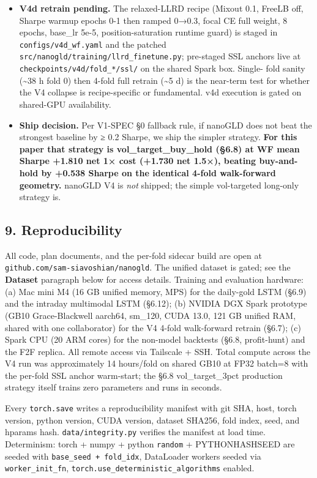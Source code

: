 \documentclass[
]{article}
\begin{document}
\begin{itemize}
  algorithmic limitation; it is a hardware one.
\item
  \textbf{V4d retrain pending.} The relaxed-LLRD recipe (Mixout 0.1,
  FreeLB off, Sharpe warmup epochs 0-1 then ramped 0→0.3, focal CE full
  weight, 8 epochs, base\_lr 5e-5, position-saturation runtime guard) is
  staged in \texttt{configs/v4d\_wf.yaml} and the patched
  \texttt{src/nanogld/training/llrd\_finetune.py}; pre-staged SSL
  anchors live at \texttt{checkpoints/v4d/fold\_*/ssl/} on the shared
  Spark box. Single- fold sanity (\textasciitilde38 h fold 0) then
  4-fold full retrain (\textasciitilde5 d) is the near-term test for
  whether the V4 collapse is recipe-specific or fundamental. v4d
  execution is gated on shared-GPU availability.
\item
  \textbf{Ship decision.} Per V1-SPEC §0 fallback rule, if nanoGLD does
  not beat the strongest baseline by ≥ 0.2 Sharpe, we ship the simpler
  strategy. \textbf{For this paper that strategy is
  vol\_target\_buy\_hold (§6.8) at WF mean Sharpe +1.810 net 1× cost
  (+1.730 net 1.5×), beating buy-and-hold by +0.538 Sharpe on the
  identical 4-fold walk-forward geometry.} nanoGLD V4 is \emph{not}
  shipped; the simple vol-targeted long-only strategy is.
\end{itemize}

\subsection{9. Reproducibility}\label{reproducibility}

All code, plan documents, and the per-fold sidecar build are open at
\texttt{github.com/sam-siavoshian/nanogld}. The unified dataset is
gated; see the \textbf{Dataset} paragraph below for access details.
Training and evaluation hardware: (a) Mac mini M4 (16 GB unified memory,
MPS) for the daily-gold LSTM (§6.9) and the intraday multimodal LSTM
(§6.12); (b) NVIDIA DGX Spark prototype (GB10 Grace-Blackwell aarch64,
sm\_120, CUDA 13.0, 121 GB unified RAM, shared with one collaborator)
for the V4 4-fold walk-forward retrain (§6.7); (c) Spark CPU (20 ARM
cores) for the non-model backtests (§6.8, profit-hunt) and the F2F
replica. All remote access via Tailscale + SSH. Total compute across the
V4 run was approximately 14 hours/fold on shared GB10 at FP32 batch=8
with the per-fold SSL anchor warm-start; the §6.8 vol\_target\_3pct
production strategy itself trains zero parameters and runs in seconds.

Every \texttt{torch.save} writes a reproducibility manifest with git
SHA, host, torch version, python version, CUDA version, dataset SHA256,
fold index, seed, and hparams hash. \texttt{data/integrity.py} verifies
the manifest at load time. Determinism: torch + numpy + python
\texttt{random} + PYTHONHASHSEED are seeded with
\texttt{base\_seed\ +\ fold\_idx}, DataLoader workers seeded via
\texttt{worker\_init\_fn}, \texttt{torch.use\_deterministic\_algorithms}
enabled.
\end{document}
